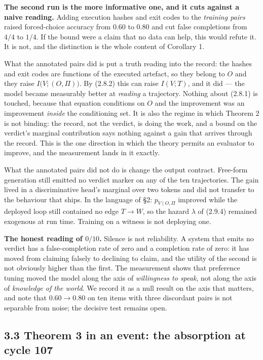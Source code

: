 \documentclass[11pt,a4paper]{article}
\begin{document}
\textbf{The second run is the more informative one, and it cuts against a naive
reading.} Adding execution hashes and exit codes to the \emph{training pairs} raised
forced-choice accuracy from \(0.60\) to \(0.80\) and cut false completions from \(4/4\)
to \(1/4\). If the bound were a claim that no data can help, this would refute it.
It is not, and the distinction is the whole content of Corollary 1.

What the annotated pairs did is put a truth reading into the record: the hashes
and exit codes are functions of the executed artefact, so they belong to \(O\) and
they raise \(I\big(V;(O,\Pi)\big)\). By (2.8.2) this can raise \(I(V;T)\), and it did ---
the model became measurably better at \emph{reading} a trajectory. Nothing about
(2.8.1) is touched, because that equation conditions on \(O\) and the improvement
was an improvement \emph{inside} the conditioning set. It is also the regime in which
Theorem 2 is not binding: the record, not the verdict, is doing the work, and a
bound on the verdict's marginal contribution says nothing against a gain that
arrives through the record. This is the one direction in which the theory permits
an evaluator to improve, and the measurement lands in it exactly.

What the annotated pairs did not do is change the output contract. Free-form
generation still emitted no verdict marker on any of the ten trajectories. The gain
lived in a discriminative head's marginal over two tokens and did not transfer to
the behaviour that ships. In the language of §2: \(p_{V\mid O,\Pi}\) improved while
the deployed loop still contained no edge \(T\to W\), so the hazard
\(\lambda\) of (2.9.4) remained exogenous at run time. Training on a witness is not
deploying one.

\textbf{The honest reading of \(0/10\).} Silence is not reliability. A system that emits
no verdict has a false-completion rate of zero and a completion rate of zero: it
has moved from claiming falsely to declining to claim, and the utility of the
second is not obviously higher than the first. The measurement shows that
preference tuning moved the model along the axis of \emph{willingness to speak}, not
along the axis of \emph{knowledge of the world}. We record it as a null result on the
axis that matters, and note that \(0.60\to0.80\) on ten items with three discordant
pairs is not separable from noise; the decisive test remains open.

\subsection{3.3 Theorem 3 in an event: the absorption at cycle 107}\label{theorem-3-in-an-event-the-absorption-at-cycle-107}
\end{document}
